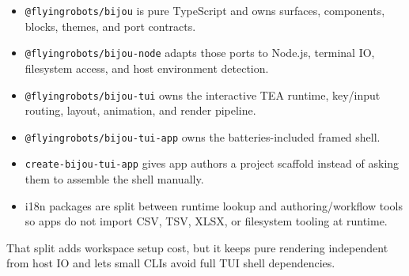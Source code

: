 \begin{itemize}
\tightlist
\item
  \texttt{@\allowbreak{}f\allowbreak{}l\allowbreak{}y\allowbreak{}i\allowbreak{}n\allowbreak{}g\allowbreak{}r\allowbreak{}o\allowbreak{}b\allowbreak{}o\allowbreak{}t\allowbreak{}s\allowbreak{}/\allowbreak{}b\allowbreak{}i\allowbreak{}j\allowbreak{}o\allowbreak{}u} is pure TypeScript and owns surfaces, components, blocks, themes, and port contracts.
\item
  \texttt{@\allowbreak{}f\allowbreak{}l\allowbreak{}y\allowbreak{}i\allowbreak{}n\allowbreak{}g\allowbreak{}r\allowbreak{}o\allowbreak{}b\allowbreak{}o\allowbreak{}t\allowbreak{}s\allowbreak{}/\allowbreak{}b\allowbreak{}i\allowbreak{}j\allowbreak{}o\allowbreak{}u\allowbreak{}-\allowbreak{}n\allowbreak{}o\allowbreak{}d\allowbreak{}e} adapts those ports to Node.js, terminal IO, filesystem access, and host environment detection.
\item
  \texttt{@\allowbreak{}f\allowbreak{}l\allowbreak{}y\allowbreak{}i\allowbreak{}n\allowbreak{}g\allowbreak{}r\allowbreak{}o\allowbreak{}b\allowbreak{}o\allowbreak{}t\allowbreak{}s\allowbreak{}/\allowbreak{}b\allowbreak{}i\allowbreak{}j\allowbreak{}o\allowbreak{}u\allowbreak{}-\allowbreak{}t\allowbreak{}u\allowbreak{}i} owns the interactive TEA runtime, key/input routing, layout, animation, and render pipeline.
\item
  \texttt{@\allowbreak{}f\allowbreak{}l\allowbreak{}y\allowbreak{}i\allowbreak{}n\allowbreak{}g\allowbreak{}r\allowbreak{}o\allowbreak{}b\allowbreak{}o\allowbreak{}t\allowbreak{}s\allowbreak{}/\allowbreak{}b\allowbreak{}i\allowbreak{}j\allowbreak{}o\allowbreak{}u\allowbreak{}-\allowbreak{}t\allowbreak{}u\allowbreak{}i\allowbreak{}-\allowbreak{}a\allowbreak{}p\allowbreak{}p} owns the batteries-included framed shell.
\item
  \texttt{c\allowbreak{}r\allowbreak{}e\allowbreak{}a\allowbreak{}t\allowbreak{}e\allowbreak{}-\allowbreak{}b\allowbreak{}i\allowbreak{}j\allowbreak{}o\allowbreak{}u\allowbreak{}-\allowbreak{}t\allowbreak{}u\allowbreak{}i\allowbreak{}-\allowbreak{}a\allowbreak{}p\allowbreak{}p} gives app authors a project scaffold instead of asking them to assemble the shell manually.
\item
  i18n packages are split between runtime lookup and authoring/workflow tools so apps do not import CSV, TSV, XLSX, or filesystem tooling at runtime.
\end{itemize}

That split adds workspace setup cost, but it keeps pure rendering independent from host IO and lets small CLIs avoid full TUI shell dependencies.

